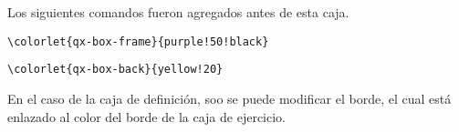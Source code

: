 \documentclass[11pt]{article}
\begin{document}

\begin{exercise}
  Los siguientes comandos fueron agregados antes de esta caja.
  
  \verb|\colorlet{qx-box-frame}{purple!50!black}|
  
  \verb|\colorlet{qx-box-back}{yellow!20}|
\end{exercise}

\begin{definition}
  En el caso de la caja de definición, soo se puede modificar el borde, el cual está enlazado al color del borde de la caja de ejercicio.
\end{definition}
\end{document}
